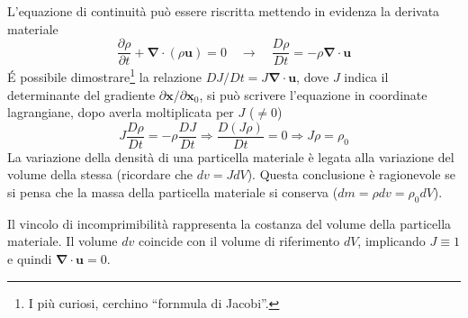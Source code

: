 %
L'equazione di continuità può essere riscritta mettendo in evidenza la derivata materiale
\begin{equation}
 \frac{\partial \rho}{\partial t} + \bm{\nabla} \cdot (\rho \bm{u}) = 0 
  \quad  \rightarrow  \quad 
  \frac{D\rho}{Dt} = -\rho \bm{\nabla} \cdot \bm{u}
\end{equation}
%
\'E possibile dimostrare\footnote{I più curiosi, cerchino ``fornmula di Jacobi''.} la relazione $DJ/Dt = J \bm{\nabla} \cdot \bm{u}$, dove
 $J$ indica il determinante del gradiente $\partial \bm{x}/\partial 
 \bm{x}_0$, si può scrivere l'equazione in coordinate lagrangiane,
 dopo averla moltiplicata per $J$ ($\ne 0$)
\begin{equation}
 J \frac{D\rho}{Dt} = - \rho \frac{DJ}{Dt} \Rightarrow
 \frac{D (J\rho)}{Dt} = 0 \Rightarrow J \rho = \rho_0
\end{equation}
%
La variazione della densità di una particella
 materiale è legata alla variazione del volume della stessa (ricordare
 che $dv = J dV$). Questa conclusione è ragionevole se si pensa che
 la massa della particella materiale si conserva ($dm = \rho dv = 
 \rho_0 dV$).
%
\begin{remark}
Il vincolo di incomprimibilità rappresenta la costanza del volume della 
 particella materiale. Il volume $dv$ coincide con il volume di riferimento $dV$, implicando $J \equiv 1$ e quindi  $\bm{\nabla} \cdot \bm{u} = 0$.
\end{remark}

